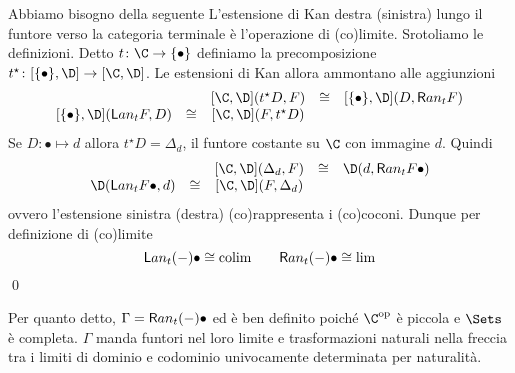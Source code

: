 Abbiamo bisogno della seguente
{\prop L'estensione di Kan destra (sinistra) lungo il funtore verso la categoria terminale è l'operazione di (co)limite.}
{\proof
Srotoliamo le definizioni. Detto $t\colon\C\to\{\bullet\}$ definiamo la precomposizione $t^\star\colon[\{\bullet\},\D]\to[\C,\D]$. Le estensioni di Kan allora ammontano alle aggiunzioni
\[\begin{array}{rcccl}
&&		[\C,\D] (t^\star D,F)
&\cong&	[\{\bullet\},\D] (D,{\textsf Ran}_tF)
\\\null	[\{\bullet\},\D] ({\textsf Lan}_tF,D)
&\cong&	[\C,\D] (F,t^\star D)
\end{array}\]
Se $D:\bullet\mapsto d$ allora $t^\star D=\Delta_d$, il funtore costante su $\C$ con immagine $d$. Quindi
\[\begin{array}{rcccl}
&&		[\C,\D] (\Delta_d,F)
&\cong&	\D (d,{\textsf Ran}_tF\bullet)
\\\null	\D ({\textsf Lan}_tF\bullet,d)
&\cong&	[\C,\D] (F,\Delta_d)
\end{array}\]
ovvero l'estensione sinistra (destra) (co)rappresenta i (co)coconi.
Dunque per definizione di (co)limite
\[
{\textsf Lan}_t(-)\bullet \cong {\rm colim}
\qquad
{\textsf Ran}_t(-)\bullet \cong {\rm lim}
\]
\qed}

Per quanto detto, $\Gamma={\textsf Ran}_t(-)\bullet$ ed è ben definito poiché $\C^\text{op}$ è piccola e $\Sets$ è completa. $\Gamma$ manda funtori nel loro limite e trasformazioni naturali nella freccia tra i limiti di dominio e codominio univocamente determinata per naturalità.


